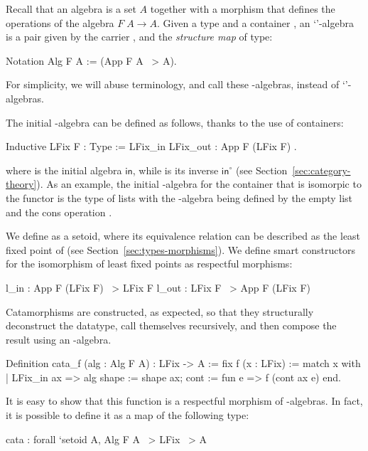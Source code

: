 \documentclass[a4paper,anonymous, UKenglish,cleveref, autoref, thm-restate]{lipics-v2021}
\newcommand{\operator}[1]{\textsf{#1}}
\newcommand{\InOp}{\operator{in}^{\circ}}
\newcommand{\InIso}{\operator{in}}
\begin{document}
Recall that an algebra is a set $A$ together with a morphism that defines the
operations of the algebra $F\;A \to A$.  Given a type  and a container
, an `'-algebra is a pair given by the carrier , and the
\emph{structure map} of type:
\begin{coqcode}
Notation Alg F A := (App F A ~> A).
\end{coqcode}

\noindent
For simplicity, we will abuse terminology, and call these
-algebras, instead of `'-algebras.

The initial -algebra can be defined as follows, thanks to the use of
containers:
\begin{coqcode}
Inductive LFix F : Type := LFix_in { LFix_out : App F (LFix F) }.
\end{coqcode}

\noindent
where  is the initial algebra $\InIso$, while  is its inverse $\InOp$ (see Section~\ref{sec:category-theory}).
As an example, the initial -algebra for the
container that is isomorpic to the functor
 is the type of lists with the -algebra
being defined by the empty list  and the cons
operation .

We define  as a setoid, where its equivalence relation can be
described as the least fixed point of  (see
Section~\ref{sec:types-morphisms}). We define smart constructors for the
isomorphism of least fixed points as respectful morphisms:
\begin{coqcode}
l_in : App F (LFix F) ~> LFix F         l_out : LFix F ~> App F (LFix F)
\end{coqcode}

Catamorphisms are constructed, as expected, so that they structurally
deconstruct the datatype, call themselves recursively, and then compose the
result using an -algebra.
\begin{coqcode}
Definition cata_f (alg : Alg F A) : LFix -> A
  := fix f (x : LFix)
     := match x with
        | LFix_in ax =>
             alg {shape := shape ax; cont := fun e => f (cont ax e)}
        end.
\end{coqcode}

It is easy to show that this function is a respectful morphism of
-algebras. In fact, it is possible to define it as a map of the
following type:
\begin{coqcode}
  cata : forall `{setoid A}, Alg F A ~> LFix ~> A
\end{coqcode}
\end{document}

